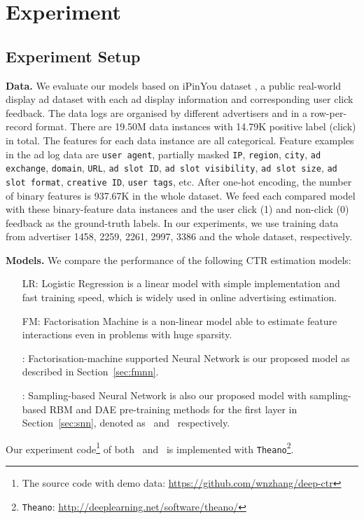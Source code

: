 \documentclass{llncs}
\newcommand{\ft}{\texttt}
\newcommand{\fmnn}{\text{FNN}}
\newcommand{\snn}{\text{SNN}}
\newcommand{\snnrbm}{\text{SNN-RBM}}
\newcommand{\snndae}{\text{SNN-DAE}}
\begin{document}
\vspace{-5pt}
\section{Experiment}\label{sec:exp}
\vspace{-3pt}
\subsection{Experiment Setup}
\textbf{Data.} We evaluate our models based on iPinYou dataset \cite{liao2014ipinyou}, a public real-world display ad dataset with each ad display information and corresponding user click feedback. The data logs are organised by different advertisers and in a row-per-record format. There are 19.50M data instances with 14.79K positive label (click) in total. The features for each data instance are all categorical. Feature examples in the ad log data are \ft{user agent}, partially masked \ft{IP}, \ft{region}, \ft{city}, \ft{ad exchange}, \ft{domain}, \ft{URL}, \ft{ad slot ID}, \ft{ad slot visibility}, \ft{ad slot size}, \ft{ad slot format}, \ft{creative ID}, \ft{user tags}, etc. After one-hot encoding, the number of binary features is 937.67K in the whole dataset. We feed each compared model with these binary-feature data instances and the user click (1) and non-click (0) feedback as the ground-truth labels. In our experiments, we use training data from advertiser 1458, 2259, 2261, 2997, 3386 and the whole dataset, respectively.





\noindent \textbf{Models.} We compare the performance of the following CTR estimation models:
\begin{itemize}
  \item [LR:] Logistic Regression \cite{richardson2007predicting} is a linear model with simple implementation and fast training speed, which is widely used in online advertising estimation.
  \item [FM:] Factorisation Machine \cite{rendle2012factorization} is a non-linear model able to estimate feature interactions even in problems with huge sparsity.
  \item [\fmnn:] Factorisation-machine supported Neural Network is our proposed model as described in Section~\ref{sec:fmnn}.
  \item [\snn:] Sampling-based Neural Network is also our proposed model with sampling-based RBM and DAE pre-training methods for the first layer in Section~\ref{sec:snn}, denoted as \snnrbm~and \snndae~respectively.
\end{itemize}
Our experiment code\footnote{The source code with demo data: \url{https://github.com/wnzhang/deep-ctr}} of both \fmnn~and \snn~is implemented with \ft{Theano}\footnote{\ft{Theano}: \url{http://deeplearning.net/software/theano/}}.
\end{document}
